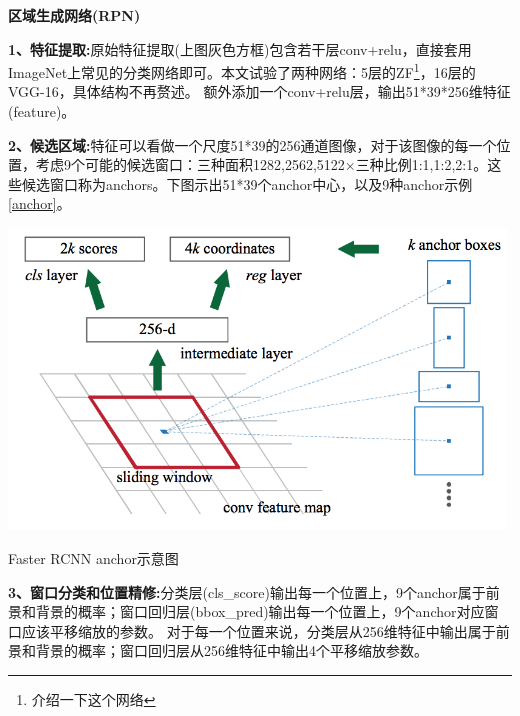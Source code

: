 \textbf{区域生成网络(RPN)}

\textbf{1、特征提取:}原始特征提取(上图灰色方框)包含若干层conv+relu，直接套用ImageNet上常见的分类网络即可。本文试验了两种网络：5层的ZF\footnote{介绍一下这个网络}，16层的VGG-16，具体结构不再赘述。 额外添加一个conv+relu层，输出51*39*256维特征(feature)。

\textbf{2、候选区域:}特征可以看做一个尺度51*39的256通道图像，对于该图像的每一个位置，考虑9个可能的候选窗口：三种面积{1282,2562,5122}×三种比例{1:1,1:2,2:1}。这些候选窗口称为anchors。下图示出51*39个anchor中心，以及9种anchor示例\ref{anchor}。
 
\begin{uscfigure}
	\includegraphics[width=\textwidth,height=8cm]{./Pictures/faster_rcnn_anchor.png}	
	\caption{Faster RCNN anchor示意图}	
	\label{anchor}
\end{uscfigure}

\textbf{3、窗口分类和位置精修:}分类层(cls\_score)输出每一个位置上，9个anchor属于前景和背景的概率；窗口回归层(bbox\_pred)输出每一个位置上，9个anchor对应窗口应该平移缩放的参数。 对于每一个位置来说，分类层从256维特征中输出属于前景和背景的概率；窗口回归层从256维特征中输出4个平移缩放参数。



